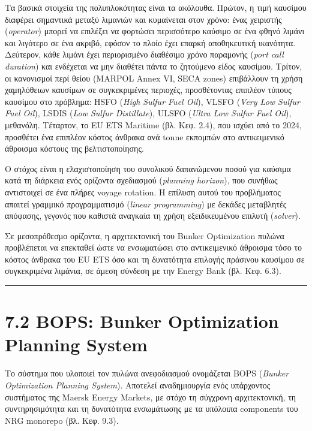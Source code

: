 Τα βασικά στοιχεία της πολυπλοκότητας είναι τα ακόλουθα. Πρώτον, η τιμή
καυσίμου διαφέρει σημαντικά μεταξύ λιμανιών και κυμαίνεται στον χρόνο:
ένας χειριστής (\emph{operator}) μπορεί να επιλέξει να φορτώσει
περισσότερο καύσιμο σε ένα φθηνό λιμάνι και λιγότερο σε ένα ακριβό,
εφόσον το πλοίο έχει επαρκή αποθηκευτική ικανότητα. Δεύτερον, κάθε
λιμάνι έχει περιορισμένο διαθέσιμο χρόνο παραμονής (\emph{port call
duration}) και ενδέχεται να μην διαθέτει πάντα το ζητούμενο είδος
καυσίμου. Τρίτον, οι κανονισμοί περί θείου (MARPOL Annex VI, SECA zones)
επιβάλλουν τη χρήση χαμηλόθειων καυσίμων σε συγκεκριμένες περιοχές,
προσθέτοντας επιπλέον τύπους καυσίμου στο πρόβλημα: HSFO (\emph{High
Sulfur Fuel Oil}), VLSFO (\emph{Very Low Sulfur Fuel Oil}), LSDIS
(\emph{Low Sulfur Distillate}), ULSFO (\emph{Ultra Low Sulfur Fuel
Oil}), μεθανόλη. Τέταρτον, το EU ETS Maritime (βλ. Κεφ. 2.4), που ισχύει
από το 2024, προσθέτει ένα επιπλέον κόστος άνθρακα ανά tonne εκπομπών
στο αντικειμενικό άθροισμα κόστους της βελτιστοποίησης.

Ο στόχος είναι η ελαχιστοποίηση του συνολικού δαπανώμενου ποσού για
καύσιμα κατά τη διάρκεια ενός ορίζοντα σχεδιασμού (\emph{planning
horizon}), που συνήθως αντιστοιχεί σε ένα πλήρες voyage rotation. Η
επίλυση αυτού του προβλήματος απαιτεί γραμμικό προγραμματισμό
(\emph{linear programming}) με δεκάδες μεταβλητές απόφασης, γεγονός που
καθιστά αναγκαία τη χρήση εξειδικευμένου επιλυτή (\emph{solver}).

Σε μεσοπρόθεσμο ορίζοντα, η αρχιτεκτονική του Bunker Optimization πυλώνα
προβλέπεται να επεκταθεί ώστε να ενσωματώσει στο αντικειμενικό άθροισμα
τόσο το κόστος άνθρακα του EU ETS όσο και τη δυνατότητα επιλογής
πράσινου καυσίμου σε συγκεκριμένα λιμάνια, σε άμεση σύνδεση με την
Energy Bank (βλ. Κεφ. 6.3).

\begin{center}\rule{0.5\linewidth}{0.5pt}\end{center}

\section{7.2 BOPS: Bunker Optimization Planning
System}\label{bops-bunker-optimization-planning-system}

Το σύστημα που υλοποιεί τον πυλώνα ανεφοδιασμού ονομάζεται BOPS
(\emph{Bunker Optimization Planning System}). Αποτελεί αναδημιουργία
ενός υπάρχοντος συστήματος της Maersk Energy Markets, με στόχο τη
σύγχρονη αρχιτεκτονική, τη συντηρησιμότητα και τη δυνατότητα ενσωμάτωσης
με τα υπόλοιπα components του NRG monorepo (βλ. Κεφ. 9.3).

